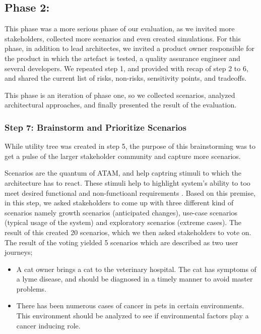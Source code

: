\documentclass[review]{elsarticle}
\begin{document}
\subsection{Phase 2:}

This phase was a more serious phase of our evaluation, as we invited more stakeholders, collected more scenarios and even created simulations. For this phase, in addition to lead architectes, we invited a product owner responsible for the product in which the artefact is tested, a quality assurance engineer and several developers. We repeated step 1, and provided with recap of step 2 to 6, and shared the current list of risks, non-risks, sensitivity points, and tradeoffs. 

This phase is an iteration of phase one, so we collected scenarios, analyzed architectural approaches, and finally presented the result of the evaluation. 

\subsubsection{Step 7: Brainstorm and Prioritize Scenarios}

While utility tree was created in step 5, the purpose of this brainstorming was to get a pulse of the larger stakeholder community and capture more scenarios.

Scenarios are the quantum of ATAM, and help captring stimuli to which the architecture has to react. These stimuli help to highlight system's ability to too meet desired functional and non-functioanl requirements \cite{KazmanATAM}. Based on this premise, in this step, we asked stakeholders to come up with three different kind of scenarios namely growth scenarios (anticipated changes), use-case scenarios (typical usage of the system) and exploratory scenarios (extreme cases). The result of this created 20 scenarios, which we then asked stakeholders to vote on. The result of the voting yielded 5 scenarios which are described as two user journeys;

\begin{itemize}
    \item A cat owner brings a cat to the veterinary hospital. The cat has symptoms of a lyme disease, and should be diagnosed in a timely manner to avoid master problems.
    \item There has been numerous cases of cancer in pets in certain environments. This environment should be analyzed to see if environmental factors play a cancer inducing role.
\end{itemize}
\end{document}

